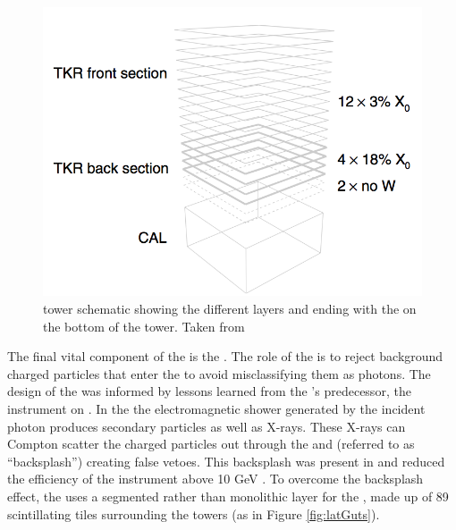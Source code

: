 \begin{figure}[h!t]
	\centering
	\includegraphics[width=1.0\columnwidth]{Figures/latPerf_Tower.png}
	\caption[\lat{} tower schematic ]{\lat{} tower schematic showing the different \tkr{}layers and ending with the \calo{} on the bottom of the tower. Taken from \cite{lat_perf}}
	\label{fig:Tower}
\end{figure}

The final vital component of the \lat{} is the \acd{}. The role of the \acd{} is to reject background charged particles that enter the \lat{} to avoid misclassifying them as photons. The design of the \acd{} was informed by lessons learned from the \lat{}'s predecessor, the \egret{} instrument on \cgro{} \citep{Mosieev05}. In the \calo{} the electromagnetic shower generated by the incident photon produces secondary particles as well as X-rays. These X-rays can Compton scatter the charged particles out through the 
\tkr{} and \acd{} (referred to as ``backsplash'') creating false vetoes. This backsplash was present in \egret{} and reduced the efficiency of the instrument above 10 GeV \cite{atwood09}. To overcome the backsplash effect, the \lat{} uses a segmented rather than monolithic layer for the \acd{}, made up of 89 scintillating tiles surrounding the towers (as in Figure \ref{fig:latGuts}).

